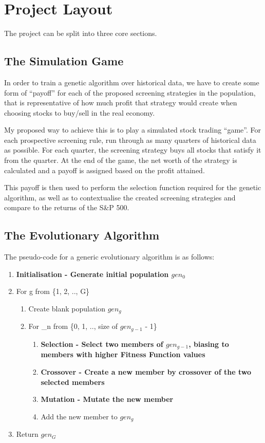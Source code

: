 \section{Project Layout}
The project can be split into three core sections.

\subsection{The Simulation Game} \label{simGameProp}
In order to train a genetic algorithm over historical data, we have to create some form of “payoff” for each of the proposed screening strategies in the population, that is representative of how much profit that strategy would create when choosing stocks to buy/sell in the real economy. \newline

My proposed way to achieve this is to play a simulated stock trading “game”. For each prospective screening rule, run through as many quarters of historical data as possible. For each quarter, the screening strategy buys all stocks that satisfy it from the quarter. At the end of the game, the net worth of the strategy is calculated and a payoff is assigned based on the profit attained. \newline

This payoff is then used to perform the selection function required for the genetic algorithm, as well as to contextualise the created screening strategies and compare to the returns of the S\&P 500.

\subsection{The Evolutionary Algorithm} \label{evoAlgoProp}
The pseudo-code for a generic evolutionary algorithm is as follows:
\begin{enumerate}
    \item \bf Initialisation \rm - Generate initial population $gen_{0}$ \vspace{-2mm}
    \item For g from \{1, 2, .., G\}
    \begin{enumerate}
        \item Create blank population $gen_{g}$
        \item For \_n from \{0, 1, .., size of $gen_{g-1}$ - 1\}
        \begin{enumerate}
            \item \bf Selection \rm - Select two members of $gen_{g-1}$, biasing to members with higher \bf Fitness Function \rm values
            \item \bf Crossover \rm - Create a new member by crossover of the two selected members
            \item \bf Mutation \rm - Mutate the new member
            \item Add the new member to $gen_{g}$
        \end{enumerate}
    \end{enumerate} \vspace{-2mm}
    \item Return $gen_{G}$
\end{enumerate}


